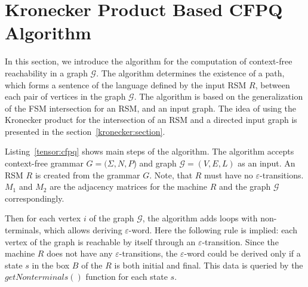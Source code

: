 \section{Kronecker Product Based CFPQ Algorithm}

In this section, we introduce the algorithm for the computation of context-free reachability in a graph $\mathcal{G}$.
The algorithm determines the existence of a path, which forms a sentence of the language defined by the input RSM $R$, between each pair of vertices in the graph $\mathcal{G}$.
The algorithm is based on the generalization of the FSM intersection for an RSM, and an input graph. The idea of using the Kronecker product for the intersection of an RSM and a directed input graph is presented in the section~\ref{kronecker:section}.



Listing~\ref{tensor:cfpq} shows main steps of the algorithm.
The algorithm accepts context-free grammar $G=(\Sigma,N,P$) and graph $\mathcal{G}=(V,E,L)$ as an input.
An RSM $R$ is created from the grammar $G$.
Note, that $R$ must have no $\varepsilon$-transitions.
$M_1$ and $M_2$ are the adjacency matrices for the machine $R$ and the graph $\mathcal{G}$ correspondingly.

Then for each vertex $i$ of the graph $\mathcal{G}$, the algorithm adds loops with non-terminals, which allows deriving $\varepsilon$-word.
Here the following rule is implied: each vertex of the graph is reachable by itself through an $\varepsilon$-transition.
Since the machine $R$ does not have any $\varepsilon$-transitions, the $\varepsilon$-word could be derived only if a state $s$ in the box $B$ of the $R$ is both initial and final.
This data is queried by the $getNonterminals()$ function for each state $s$.


